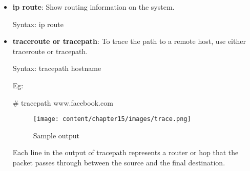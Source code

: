 \begin{flushleft}
\begin{itemize}
\begin{itemize}
		\newpage
		\item \textbf{ip route}: Show routing information on the system.
		\bigskip
		\begin{tcolorbox}[breakable,notitle,boxrule=0pt,colback=pink,colframe=pink]
				\color{black}
				\font=9pt
				Syntax: ip route
				\font=4pt
		\end{tcolorbox}						
		\bigskip
		\bigskip
		\item \textbf{traceroute or tracepath}: To trace the path to a remote host, use either traceroute or tracepath.
		\bigskip
		\begin{tcolorbox}[breakable,notitle,boxrule=0pt,colback=pink,colframe=pink]
				\color{black}
				\font=9pt
				Syntax: tracepath hostname
				\font=4pt
		\end{tcolorbox}					
		Eg:
		\begin{tcolorbox}[breakable,notitle,boxrule=-0pt,colback=black,colframe=black]
			\color{green}
			\font=9pt
			\# tracepath www.facebook.com
			\font=4pt
		\end{tcolorbox}
		\begin{figure}[h!]
			\centering
			\texttt{[image: content/chapter15/images/trace.png]}
			\caption{Sample output}
			\label{fig:output75}
		\end{figure}
		Each line in the output of tracepath represents a router or hop that the packet passes through
		between the source and the final destination.
			
	\end{itemize}


	
\end{itemize}

\end{flushleft}
\newpage


